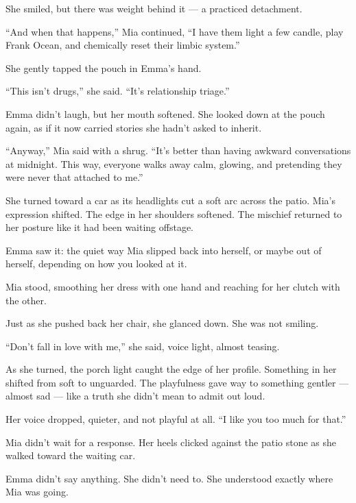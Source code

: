 She smiled, but there was weight behind it — a practiced detachment.

``And when that happens,'' Mia continued, ``I have them light a few candle, 
play Frank Ocean, and chemically reset their limbic system.''

She gently tapped the pouch in Emma’s hand.

``This isn’t drugs,'' she said. ``It’s relationship triage.''

Emma didn’t laugh, but her mouth softened. She looked down at the pouch again,
as if it now carried stories she hadn’t asked to inherit.

``Anyway,'' Mia said with a shrug. ``It's better than having awkward conversations 
at midnight. This way, everyone walks away calm, glowing, and pretending they were
never that attached to me.''

She turned toward a car as its headlights cut a soft arc across the patio.
Mia’s expression shifted.
The edge in her shoulders softened. The mischief returned to her posture like it had 
been waiting offstage.

Emma saw it: the quiet way Mia slipped back into herself, or maybe out of herself, 
depending on how you looked at it.

Mia stood, smoothing her dress with one hand and reaching for her clutch with the other.

Just as she pushed back her chair, she glanced down. She was not smiling.

``Don’t fall in love with me,'' she said, voice light, almost teasing.

As she turned, the porch light caught the edge of her profile.
Something in her shifted from soft to unguarded. The playfulness gave way to 
something gentler --- almost sad --- like a truth she didn’t mean to admit out loud.

Her voice dropped, quieter, and not playful at all.
``I like you too much for that.''

Mia didn’t wait for a response. Her heels clicked against the patio stone as she walked 
toward the waiting car.

Emma didn’t say anything. She didn’t need to.
She understood exactly where Mia was going.



